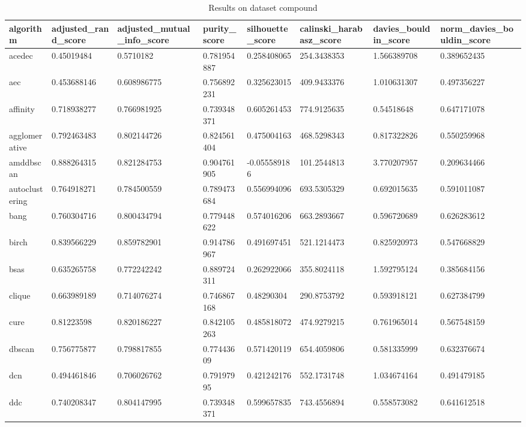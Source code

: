 \clearpage

\begin{table}[H]
\centering
\caption{Results on dataset compound}
\label{S60_Table}
\begin{tabular}{|l|l|l|l|l|l|l|l|}
\hline
algorithm & adjusted\_rand\_score & adjusted\_mutual\_info\_score & purity\_score & silhouette\_score & calinski\_harabasz\_score & davies\_bouldin\_score & norm\_davies\_bouldin\_score \\
\hline
acedec & 0.45019484 & 0.5710182 & 0.781954887 & 0.258408065 & 254.3438353 & 1.566389708 & 0.389652435 \\
\hline
aec & 0.453688146 & 0.608986775 & 0.756892231 & 0.325623015 & 409.9433376 & 1.010631307 & 0.497356227 \\
\hline
affinity & 0.718938277 & 0.766981925 & 0.739348371 & 0.605261453 & 774.9125635 & 0.54518648 & 0.647171078 \\
\hline
agglomerative & 0.792463483 & 0.802144726 & 0.824561404 & 0.475004163 & 468.5298343 & 0.817322826 & 0.550259968 \\
\hline
amddbscan & 0.888264315 & 0.821284753 & 0.904761905 & -0.055589186 & 101.2544813 & 3.770207957 & 0.209634466 \\
\hline
autoclustering & 0.764918271 & 0.784500559 & 0.789473684 & 0.556994096 & 693.5305329 & 0.692015635 & 0.591011087 \\
\hline
bang & 0.760304716 & 0.800434794 & 0.779448622 & 0.574016206 & 663.2893667 & 0.596720689 & 0.626283612 \\
\hline
birch & 0.839566229 & 0.859782901 & 0.914786967 & 0.491697451 & 521.1214473 & 0.825920973 & 0.547668829 \\
\hline
bsas & 0.635265758 & 0.772242242 & 0.889724311 & 0.262922066 & 355.8024118 & 1.592795124 & 0.385684156 \\
\hline
clique & 0.663989189 & 0.714076274 & 0.746867168 & 0.48290304 & 290.8753792 & 0.593918121 & 0.627384799 \\
\hline
cure & 0.81223598 & 0.820186227 & 0.842105263 & 0.485818072 & 474.9279215 & 0.761965014 & 0.567548159 \\
\hline
dbscan & 0.756775877 & 0.798817855 & 0.77443609 & 0.571420119 & 654.4059806 & 0.581335999 & 0.632376674 \\
\hline
dcn & 0.494461846 & 0.706026762 & 0.79197995 & 0.421242176 & 552.1731748 & 1.034674164 & 0.491479185 \\
\hline
ddc & 0.740208347 & 0.804147995 & 0.739348371 & 0.599657835 & 743.4556894 & 0.558573082 & 0.641612518 \\

\end{tabular}
\end{table}
